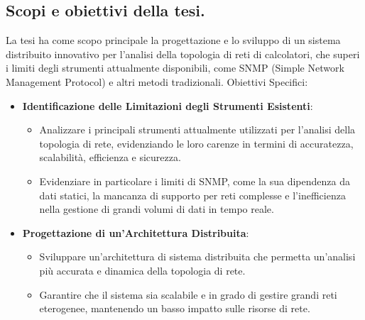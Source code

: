 \documentclass[target=bach,aauheader=,style=]{thud}
\begin{document}
\subsection{Scopi e obiettivi della tesi.}
La tesi ha come scopo principale la progettazione e lo sviluppo di un sistema distribuito innovativo per l'analisi della topologia di reti di calcolatori, che superi i limiti degli strumenti attualmente disponibili, come SNMP (Simple Network Management Protocol) e altri metodi tradizionali.
\newline
Obiettivi Specifici:
\begin{itemize}
  \item \textbf{Identificazione delle Limitazioni degli Strumenti Esistenti}:
    \begin{itemize}
      \item Analizzare i principali strumenti attualmente utilizzati per l'analisi della topologia di rete, evidenziando le loro carenze in termini di accuratezza, scalabilità, efficienza e sicurezza.
    \item Evidenziare in particolare i limiti di SNMP, come la sua dipendenza da dati statici, la mancanza di supporto per reti complesse e l'inefficienza nella gestione di grandi volumi di dati in tempo reale.
    \end{itemize}

  \item \textbf{Progettazione di un'Architettura Distribuita}:
    \begin{itemize}
      \item Sviluppare un'architettura di sistema distribuita che permetta un'analisi più accurata e dinamica della topologia di rete.
      \item Garantire che il sistema sia scalabile e in grado di gestire grandi reti eterogenee, mantenendo un basso impatto sulle risorse di rete.
    \end{itemize}
    


\end{itemize}
\end{document}
